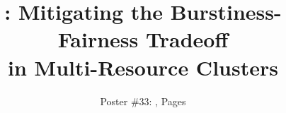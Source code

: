 \documentclass[preprint]{sig-alternate-10pt} %
\begin{document}




\title{\name: Mitigating the Burstiness-Fairness Tradeoff\\ in Multi-Resource Clusters}
\subtitle{Poster \#33: , \pageref{EndOfPaper} Pages}


\maketitle

%




%



% 

%






{\small 
 

}
\end{document}
